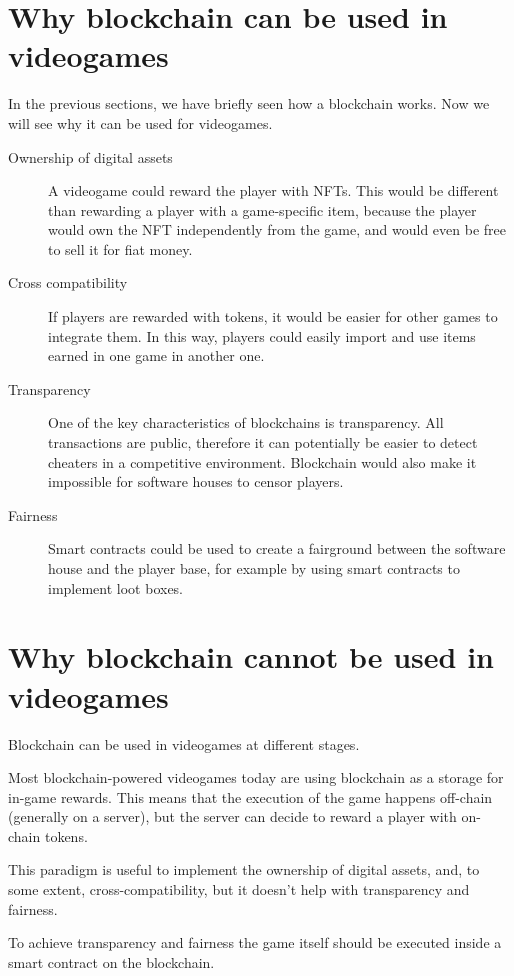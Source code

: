 \documentclass[12pt]{article}
\begin{document}
\section{Why blockchain can be used in videogames} \label{section:wbcbuiv}
In the previous sections, we have briefly seen how a blockchain works. Now we will see why it can be used for videogames.
\begin{description}
    \item[Ownership of digital assets] A videogame could reward the player with NFTs. This would be different than rewarding a player with a game-specific item, because the player would own the NFT independently from the game, and would even be free to sell it for fiat money.
    \item[Cross compatibility] If players are rewarded with tokens, it would be easier for other games to integrate them. In this way, players could easily import and use items earned in one game in another one.
    \item[Transparency] One of the key characteristics of blockchains is transparency. All transactions are public, therefore it can potentially be easier to detect cheaters in a competitive environment. Blockchain would also make it impossible for software houses to censor players.
    \item[Fairness] Smart contracts could be used to create a fairground between the software house and the player base, for example by using smart contracts to implement loot boxes.  
\end{description}

\section{Why blockchain cannot be used in videogames} \label{section:wbcnbuiv}
Blockchain can be used in videogames at different stages.

Most blockchain-powered videogames today are using blockchain as a storage for in-game rewards. This means that the execution of the game happens off-chain (generally on a server), but the server can decide to reward a player with on-chain tokens.

This paradigm is useful to implement the ownership of digital assets, and, to some extent, cross-compatibility, but it doesn't help with transparency and fairness.

To achieve transparency and fairness the game itself should be executed inside a smart contract on the blockchain.
\end{document}
